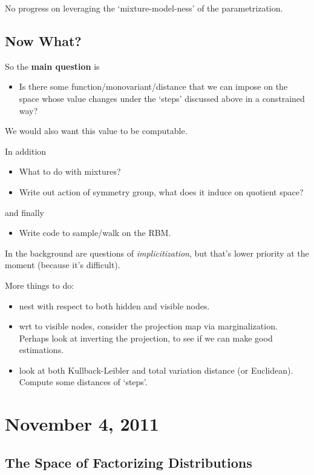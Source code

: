 \documentclass[12pt]{article}
\begin{document}
No progress on leveraging the `mixture-model-ness' of the parametrization.

\subsection{Now What?}

So the \textbf{main question} is
\begin{itemize}
    \item Is there some function/monovariant/distance that we can impose on the
    space whose value changes under the `steps' discussed above in a constrained
    way?
\end{itemize}
We would also want this value to be computable.

In addition
\begin{itemize}
    \item What to do with mixtures?
    \item Write out action of symmetry group, what does it induce on quotient
    space?
\end{itemize}
and finally
\begin{itemize}
    \item Write code to sample/walk on the RBM.
\end{itemize}
In the background are questions of \textit{implicitization}, but that's lower
priority at the moment (because it's difficult).

More things to do:
\begin{itemize}
    \item nest with respect to both hidden and visible nodes.
    \item wrt to visible nodes, consider the projection map via marginalization.
          Perhaps look at inverting the projection, to see if we can make good
          estimations.
    \item look at both Kullback-Leibler and total variation distance (or
          Euclidean).  Compute some distances of `steps'.
\end{itemize}

\section{November 4, 2011}

\subsection{The Space of Factorizing Distributions}
\end{document}
